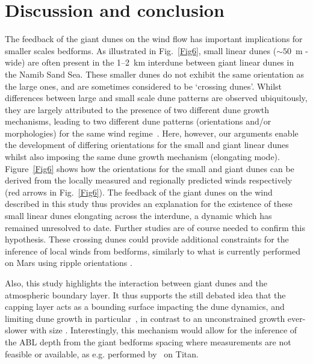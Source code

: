\section{Discussion and conclusion}
The feedback of the giant dunes on the wind flow has important implications for smaller scales bedforms. As illustrated in Fig.~\ref{Fig6}, small linear dunes ($\sim50$~m -wide) are often present in the 1--2~km interdune between giant linear dunes in the Namib Sand Sea. These smaller dunes do not exhibit the same orientation as the large ones, and are sometimes considered to be `crossing dunes'. Whilst differences between large and small scale dune patterns are observed ubiquitously, they are largely attributed to the presence of two different dune growth mechanisms, leading to two different dune patterns (orientations and/or morphologies) for the same wind regime~\citep{Courrech2014, Runyon2017, lu2017, Song2019, Gadal2020, Hu2021}. Here, however, our arguments enable the development of differing orientations for the small and giant linear dunes whilst also imposing the same dune growth mechanism (elongating mode). Figure~\ref{Fig6} shows how the orientations for the small and giant dunes can be derived from the locally measured and regionally predicted winds respectively (red arrows in Fig.~\ref{Fig6}). The feedback of the giant dunes on the wind described in this study thus provides an explanation for the existence of these small linear dunes elongating across the interdune, a dynamic which has remained unresolved to date. Further studies are of course needed to confirm this hypothesis. These crossing dunes could provide additional constraints for the inference of local winds from bedforms, similarly to what is currently performed on Mars using ripple orientations \citep{Liu2015, Hood2021}.

Also, this study highlights the interaction between giant dunes and the atmospheric boundary layer. It thus supports the still debated idea that the capping layer acts as a bounding surface impacting the dune dynamics, and limiting dune growth in particular~\citep{Andreotti2009}, in contrast to an unconstrained growth ever-slower with size \citep{Eastwood2011, gunn2021}. Interestingly, this mechanism would allow for the inference of the ABL depth from the giant bedforms spacing where measurements are not feasible or available, as e.g. performed by~\citet{Lorenz2010} on Titan.

